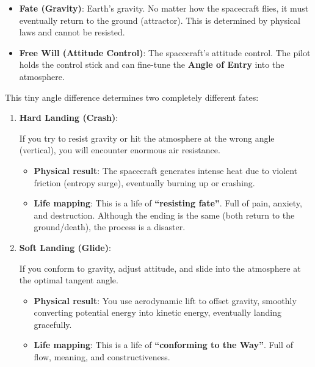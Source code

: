 \begin{itemize}
\item \textbf{Fate (Gravity)}: Earth's gravity. No matter how the spacecraft flies, it must eventually return to the ground (attractor). This is determined by physical laws and cannot be resisted.

\item \textbf{Free Will (Attitude Control)}: The spacecraft's attitude control. The pilot holds the control stick and can fine-tune the \textbf{Angle of Entry} into the atmosphere.
\end{itemize}

This tiny angle difference determines two completely different fates:

\begin{enumerate}
\item \textbf{Hard Landing (Crash)}:

If you try to resist gravity or hit the atmosphere at the wrong angle (vertical), you will encounter enormous air resistance.

\begin{itemize}
\item \textbf{Physical result}: The spacecraft generates intense heat due to violent friction (entropy surge), eventually burning up or crashing.

\item \textbf{Life mapping}: This is a life of \textbf{``resisting fate''}. Full of pain, anxiety, and destruction. Although the ending is the same (both return to the ground/death), the process is a disaster.
\end{itemize}

\item \textbf{Soft Landing (Glide)}:

If you conform to gravity, adjust attitude, and slide into the atmosphere at the optimal tangent angle.

\begin{itemize}
\item \textbf{Physical result}: You use aerodynamic lift to offset gravity, smoothly converting potential energy into kinetic energy, eventually landing gracefully.

\item \textbf{Life mapping}: This is a life of \textbf{``conforming to the Way''}. Full of flow, meaning, and constructiveness.
\end{itemize}
\end{enumerate}

